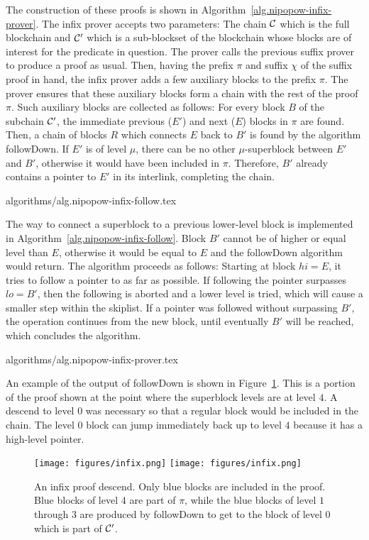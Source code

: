 The construction of these proofs is shown in
Algorithm~\ref{alg.nipopow-infix-prover}. The infix prover accepts two
parameters: The chain $\mathcal{C}$ which is the full blockchain and $\mathcal{C}'$ which
is a sub-blockset of the blockchain whose blocks are of interest for the
predicate in question. The prover calls the previous suffix prover to produce a
proof as usual. Then, having the prefix $\pi$ and suffix $\chi$ of the suffix
proof in hand, the infix prover adds a few auxiliary blocks to the prefix $\pi$.
The prover ensures that these auxiliary blocks form a chain with the rest of the
proof $\pi$. Such auxiliary blocks are collected as follows: For every block $B$
of the subchain $\mathcal{C}'$, the immediate previous ($E'$) and next ($E$) blocks
in $\pi$ are found. Then, a chain of blocks $R$ which connects $E$ back to $B'$
is found by the algorithm followDown. If $E'$ is of level $\mu$, there can be no
other $\mu$-superblock between $E'$ and $B'$, otherwise it would have been
included in $\pi$. Therefore, $B'$ already contains a pointer to $E'$ in its
interlink, completing the chain.

{algorithms/alg.nipopow-infix-follow.tex}

The way to connect a superblock to a previous lower-level block is implemented
in Algorithm~\ref{alg.nipopow-infix-follow}.  Block $B'$ cannot be of higher or
equal level than $E$, otherwise it would be equal to $E$ and the followDown
algorithm would return. The algorithm proceeds as follows: Starting at block $hi =
E$, it tries to follow a pointer to as far as possible. If following the pointer
surpasses $lo = B'$, then the following is aborted and a lower level is tried,
which will cause a smaller step within the skiplist. If a pointer was followed
without surpassing $B'$, the operation continues from the new block, until
eventually $B'$ will be reached, which concludes the algorithm.

{algorithms/alg.nipopow-infix-prover.tex}

An example of the output of followDown is shown in Figure~\ref{fig.infix}. This
is a portion of the proof shown at the point where the superblock levels are at
level $4$. A descend to level $0$ was necessary so that a regular block would be
included in the chain. The level $0$ block can jump immediately back up to level
$4$ because it has a high-level pointer.

\begin{figure}[h]
    \caption{An infix proof descend. Only blue blocks are included in the proof.
    Blue blocks of level $4$ are part of $\pi$, while the blue blocks of level
    $1$ through $3$ are produced by followDown to get to the block of level $0$
    which is part of $\mathcal{C}'$.}
    \centering
    \iftwocolumn
        \texttt{[image: figures/infix.png]}
    \else
        \texttt{[image: figures/infix.png]}
    \fi
    \label{fig.infix}
\end{figure}

